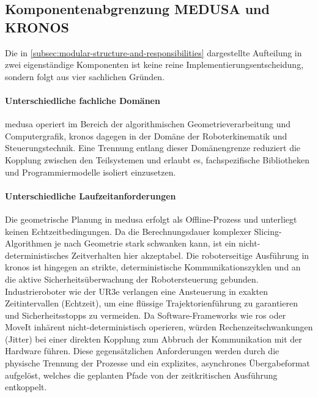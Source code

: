         \subsection{Komponentenabgrenzung MEDUSA und KRONOS}\label{subsec:concept-component-separation-medusa-kronos}
            Die in \cref{subsec:modular-structure-and-responsibilities} dargestellte Aufteilung in zwei eigenständige Komponenten ist keine reine Implementierungsentscheidung, sondern folgt aus vier sachlichen Gründen.

            \paragraph{Unterschiedliche fachliche Domänen}
                \ac{medusa} operiert im Bereich der algorithmischen Geometrieverarbeitung und Computergrafik, \ac{kronos} dagegen in der Domäne der Roboterkinematik und Steuerungstechnik.
                Eine Trennung entlang dieser Domänengrenze reduziert die Kopplung zwischen den Teilsystemen und erlaubt es, fachspezifische Bibliotheken und Programmiermodelle isoliert einzusetzen.

            \paragraph{Unterschiedliche Laufzeitanforderungen}
                Die geometrische Planung in \ac{medusa} erfolgt als Offline-Prozess und unterliegt keinen Echtzeitbedingungen.
                Da die Berechnungsdauer komplexer Slicing-Algorithmen je nach Geometrie stark schwanken kann, ist ein nicht-deterministisches Zeitverhalten hier akzeptabel.
                Die roboterseitige Ausführung in \ac{kronos} ist hingegen an strikte, deterministische Kommunikationszyklen und an die aktive Sicherheitsüberwachung der Robotersteuerung gebunden.
                Industrieroboter wie der UR3e verlangen eine Ansteuerung in exakten Zeitintervallen (Echtzeit), um eine flüssige Trajektorienführung zu garantieren und Sicherheitsstopps zu vermeiden.
                Da Software-Frameworks wie \ac{ros} oder MoveIt inhärent nicht-deterministisch operieren, würden Rechenzeitschwankungen (Jitter) bei einer direkten Kopplung zum Abbruch der Kommunikation mit der Hardware führen.
                Diese gegensätzlichen Anforderungen werden durch die physische Trennung der Prozesse und ein explizites, asynchrones Übergabeformat aufgelöst, welches die geplanten Pfade von der zeitkritischen Ausführung entkoppelt.

